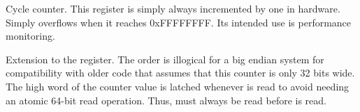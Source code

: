 

Cycle counter. This register is simply always incremented by one in hardware.
Simply overflows when it reaches 0xFFFFFFFF. Its intended use is performance
monitoring.

\implementation{}


Extension to the  register. The order is illogical for a big endian 
system for compatibility with older code that assumes that this counter is only 
32 bits wide. The high word of the counter value is latched whenever  
is read to avoid needing an atomic 64-bit read operation. Thus,  must 
always be read before  is read.

\implementation{}

